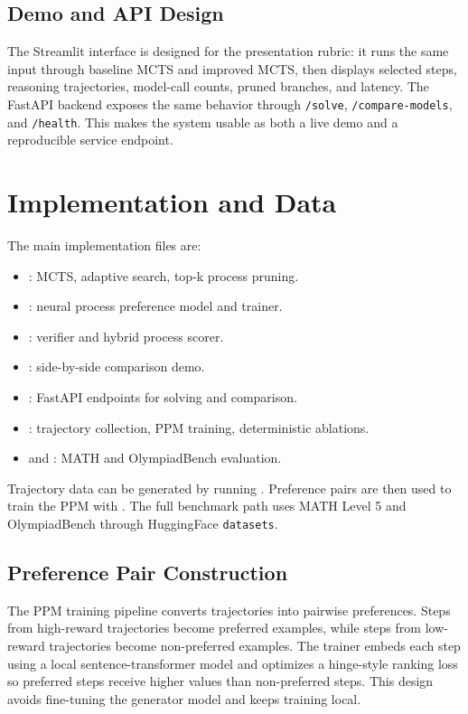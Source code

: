 \documentclass[sigconf,nonacm]{acmart}
\begin{document}
\subsection{Demo and API Design}

The Streamlit interface is designed for the presentation rubric: it runs the
same input through baseline MCTS and improved MCTS, then displays selected
steps, reasoning trajectories, model-call counts, pruned branches, and latency.
The FastAPI backend exposes the same behavior through \texttt{/solve},
\texttt{/compare-models}, and \texttt{/health}. This makes the system usable as
both a live demo and a reproducible service endpoint.

\section{Implementation and Data}

The main implementation files are:

\begin{itemize}
    \item {}: MCTS, adaptive search, top-k process pruning.
    \item {}: neural process preference model and trainer.
    \item {}: verifier and hybrid process scorer.
    \item {}: side-by-side comparison demo.
    \item {}: FastAPI endpoints for solving and comparison.
    \item {}: trajectory collection, PPM training, deterministic ablations.
    \item {} and : MATH and OlympiadBench evaluation.
\end{itemize}

Trajectory data can be generated by running
. Preference pairs are then used to train
the PPM with . The full benchmark path uses MATH Level
5 and OlympiadBench through HuggingFace \texttt{datasets}.

\subsection{Preference Pair Construction}

The PPM training pipeline converts trajectories into pairwise preferences.
Steps from high-reward trajectories become preferred examples, while steps from
low-reward trajectories become non-preferred examples. The trainer embeds each
step using a local sentence-transformer model and optimizes a hinge-style
ranking loss so preferred steps receive higher values than non-preferred steps.
This design avoids fine-tuning the generator model and keeps training local.
\end{document}
